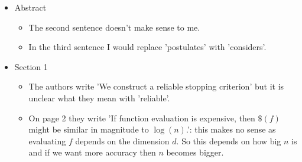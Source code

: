 \documentclass{amsart}
\begin{document}
\begin{itemize}
\item Abstract
\begin{itemize}
\item The second sentence doesn't make sense to me. 
\item In the third sentence I would replace 'postulates' with 'considers'.  
\end{itemize}

\item Section 1
\begin{itemize}
\item The authors write 'We construct a reliable stopping criterion' but it is
unclear what they mean with 'reliable'. 
\item On page 2 they write 'If function evaluation is expensive, then $\$(f)$ might be similar in magnitude to $\log(n)$.': this makes no sense as evaluating $f$
depends on the dimension $d$. So this depends on how big $n$ is and if we want more
accuracy then $n$ becomes bigger. 
\end{itemize}


\end{itemize}
\end{document}
